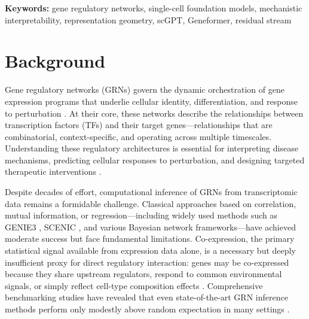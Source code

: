 \documentclass[11pt]{article}
\begin{document}
\begin{abstract}
\textbf{Conclusions:}
Foundation model residual streams carry incremental, regulatory-relevant geometric signal that is distributed across layers and that complements expression-based GRN inference for retrospective edge prioritization.
The signal is statistical enrichment rather than a stand-alone regulatory classifier: absolute performance is modest and out-of-entity generalization is limited, so its practical role is as an orthogonal evidence channel for edge re-ranking and hypothesis prioritization in multi-evidence frameworks.
\end{abstract}

\textbf{Keywords:} gene regulatory networks, single-cell foundation models, mechanistic interpretability, representation geometry, scGPT, Geneformer, residual stream

\newpage

\section*{Background}

Gene regulatory networks (GRNs) govern the dynamic orchestration of gene expression programs that underlie cellular identity, differentiation, and response to perturbation \cite{davidson2002genomic,alon2007network}.
At their core, these networks describe the relationships between transcription factors (TFs) and their target genes---relationships that are combinatorial, context-specific, and operating across multiple timescales.
Understanding these regulatory architectures is essential for interpreting disease mechanisms, predicting cellular responses to perturbation, and designing targeted therapeutic interventions \cite{karlebach2008modelling}.

Despite decades of effort, computational inference of GRNs from transcriptomic data remains a formidable challenge.
Classical approaches based on correlation, mutual information, or regression---including widely used methods such as GENIE3 \cite{huynh2010inferring}, SCENIC \cite{aibar2017scenic}, and various Bayesian network frameworks---have achieved moderate success but face fundamental limitations.
Co-expression, the primary statistical signal available from expression data alone, is a necessary but deeply insufficient proxy for direct regulatory interaction: genes may be co-expressed because they share upstream regulators, respond to common environmental signals, or simply reflect cell-type composition effects \cite{pratapa2020benchmarking}.
Comprehensive benchmarking studies have revealed that even state-of-the-art GRN inference methods perform only modestly above random expectation in many settings \cite{pratapa2020benchmarking,dibaeinia2020sergio}.
\end{document}
